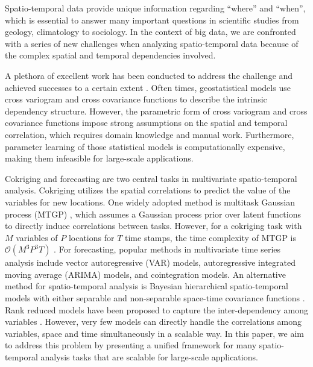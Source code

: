 Spatio-temporal data provide unique information regarding ``where'' and ``when'', which is essential to answer many important  questions in scientific studies from geology, climatology to sociology. In the context of big data, we are confronted with a series of new challenges when analyzing spatio-temporal data because of the complex spatial and temporal dependencies involved. 

A plethora of excellent work has been conducted to address the challenge and achieved successes to a certain extent  \cite{cressie2010fixed, isaaks2011applied}. Often times, geostatistical models use cross variogram and cross covariance functions to describe the intrinsic dependency structure. However, the parametric form of cross variogram and cross covariance functions impose strong assumptions on the spatial and temporal correlation, which requires domain knowledge and manual work. Furthermore, parameter learning of those statistical models is computationally expensive, making them infeasible for  large-scale applications. 

Cokriging and forecasting are two central tasks in multivariate spatio-temporal analysis. Cokriging utilizes the spatial correlations to predict the value of the variables for new locations. One widely adopted method is  multitask Gaussian process (MTGP) \cite{bonilla2007multi}, which assumes a Gaussian process prior 
over latent functions to directly induce correlations between tasks. However, for a cokriging task with $M$ variables of $P$ locations for $T$ time stamps, the time complexity of MTGP is $\mathcal{O}(M^3P^3T)$ \cite{}. 
For forecasting,  popular methods in multivariate time series analysis include  vector autoregressive (VAR) models, autoregressive integrated moving average (ARIMA) models, and cointegration models. An alternative method for spatio-temporal analysis  is Bayesian hierarchical spatio-temporal models with either  separable and non-separable space-time covariance functions \cite{cressie1999classes}. Rank reduced models have been proposed to capture the inter-dependency among variables \cite{anderson1951estimating}. However, very few models can directly handle the correlations among variables, space and time simultaneously in a scalable way. In this paper, we aim to address this problem by presenting a unified framework for many spatio-temporal analysis tasks that are scalable for large-scale applications. %

